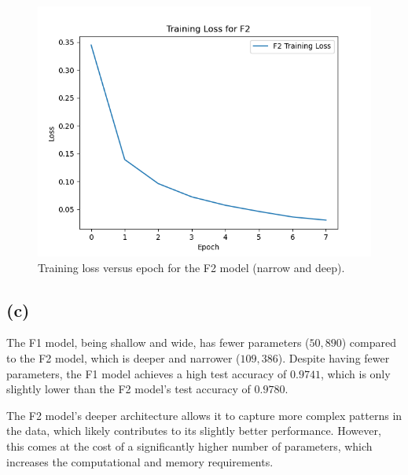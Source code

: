 \documentclass{article}
\begin{document}
\begin{figure}[ht]
    \centering
    \includegraphics[width=0.75\linewidth]{F2_loss.png}
    \caption{Training loss versus epoch for the F2 model (narrow and deep).}
    \label{fig:f2_loss}
\end{figure}

\subsection*{(c)}
The F1 model, being shallow and wide, has fewer parameters (\(50,890\)) compared to the F2 model, which is deeper and narrower (\(109,386\)). Despite having fewer parameters, the F1 model achieves a high test accuracy of \(0.9741\), which is only slightly lower than the F2 model's test accuracy of \(0.9780\). 

The F2 model's deeper architecture allows it to capture more complex patterns in the data, which likely contributes to its slightly better performance. However, this comes at the cost of a significantly higher number of parameters, which increases the computational and memory requirements.
\end{document}
